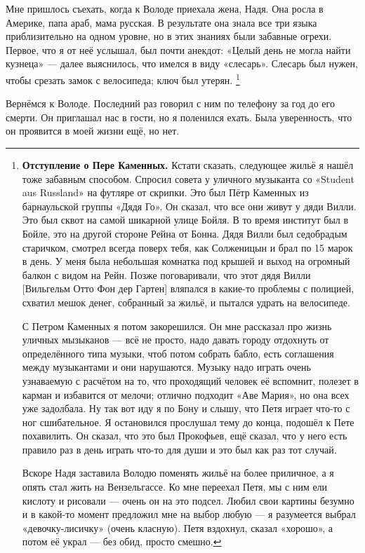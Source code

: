 \documentclass{book}
\begin{document}
Мне пришлось съехать, когда к Володе приехала жена, Надя.
Она росла в Америке, папа араб, мама русская.
В результате она знала все три языка приблизительно на одном уровне, но в этих знаниях были забавные огрехи.
Первое, что я от неё услышал, был почти анекдот: «Целый день не могла найти кузнеца» --- далее выяснилось, что имелся в виду «слесарь».
Слесарь был нужен, чтобы срезать замок с велосипеда; ключ был утерян.%
\footnote{\textbf{Отступление о Пере Каменных.}
Кстати сказать, следующее жильё я нашёл тоже забавным способом.
Спросил совета у уличного музыканта со «Student aus Russland» на футляре от скрипки.
Это был Пётр Каменных  из барнаульской группы «Дядя Го».
Он сказал, что все они живут у дяди Вилли.
Это был сквот на самой шикарной улице Бойля.
В то время институт был в Бойле, это на другой стороне Рейна от Бонна.
Дядя Вилли был седобрадым старичком, смотрел всегда поверх тебя, как Солженицын и брал по 15 марок в день.
У меня была небольшая комнатка под крышей и выход на огромный балкон с видом на Рейн.
Позже поговаривали, что этот дядя Вилли [Вильгельм Отто Фон дер Гартен] вляпался в какие-то проблемы с полицией, схватил мешок денег, собранный за жильё, и пытался удрать на велосипеде.

С Петром Каменных я потом закорешился.
Он мне рассказал про жизнь уличных мызыканов --- всё не просто, надо давать городу отдохнуть от определённого типа музыки, чтоб потом собрать бабло, есть соглашения между музыкантами и они нарушаются.
Музыку надо играть очень узнаваемую с расчётом на то, что проходящий человек её вспомнит, полезет в карман и избавится от мелочи; отлично подходит «Аве Мария», но она всех уже задолбала.
Ну так вот иду я по Бону и слышу, что Петя играет что-то с ног сшибательное.
Я остановился прослушал тему до конца, подошёл к Пете похавилить.
Он сказал, что это был Прокофьев, ещё сказал, что у него есть правило раз в день играть что-то для души и это был как раз тот случай.

Вскоре Надя заставила Володю поменять жильё на более приличное, а я опять стал жить на Вензельгассе.
Ко мне переехал Петя, мы с ним ели кислоту и рисовали --- очень он на это подсел.
Любил свои картины безумно и в какой-то момент предложил мне на выбор любую --- я разумеется выбрал «девочку-лисичку» (очень класную).
Петя вздохнул, сказал «хорошо», а потом её украл --- без обид, просто смешно.}

Вернёмся к Володе.
Последний раз говорил с ним по телефону за год до его смерти.
Он приглашал нас в гости, но я поленился ехать.
Была уверенность, что он проявится в моей жизни ещё, но нет.
\end{document}
